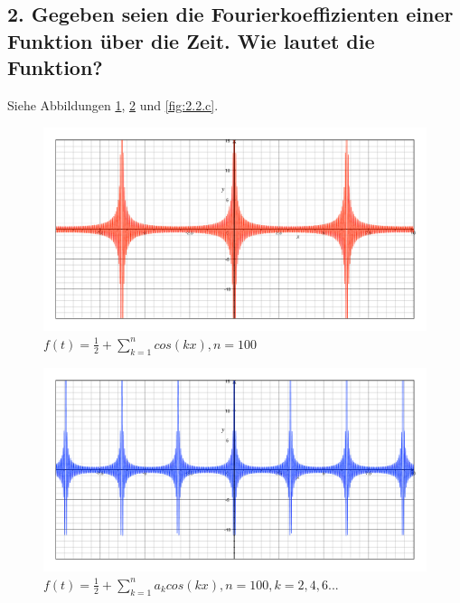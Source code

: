 \subsection*{2. Gegeben seien die Fourierkoeffizienten einer Funktion \"uber die Zeit. Wie lautet die Funktion?}
Siehe Abbildungen \ref{fig:2.2.a},  \ref{fig:2.2.b} und \ref{fig:2.2.c}.
\begin{figure}[p] %
   \centering
   \includegraphics[width=0.4\textheight]{Uebung2/Aufgabe_2_2_a.pdf} 
   \caption{$f(t)=\frac{1}{2}+\sum_{k=1}^n cos(kx), n=100$}
   \label{fig:2.2.a}
\end{figure}
\begin{figure}[p] %
   \centering
   \includegraphics[width=0.4\textheight]{Uebung2/Aufgabe_2_2_b.pdf} 
   \caption{$f(t)=\frac{1}{2}+\sum_{k=1}^n a_{k}cos(kx), n=100, k=2,4,6...$}
   \label{fig:2.2.b}
\end{figure}

